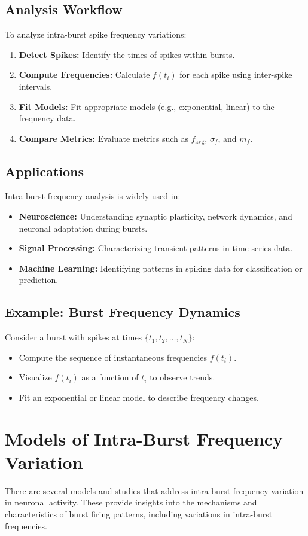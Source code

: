 \documentclass[a4paper,9pt]{extarticle}
\begin{document}
\subsection{Analysis Workflow}
To analyze intra-burst spike frequency variations:
\begin{enumerate}
    \item \textbf{Detect Spikes:} Identify the times of spikes within bursts.
    \item \textbf{Compute Frequencies:} Calculate $f(t_i)$ for each spike using inter-spike intervals.
    \item \textbf{Fit Models:} Fit appropriate models (e.g., exponential, linear) to the frequency data.
    \item \textbf{Compare Metrics:} Evaluate metrics such as $f_{\text{avg}}$, $\sigma_f$, and $m_f$.
\end{enumerate}

\subsection{Applications}
Intra-burst frequency analysis is widely used in:
\begin{itemize}
    \item \textbf{Neuroscience:} Understanding synaptic plasticity, network dynamics, and neuronal adaptation during bursts.
    \item \textbf{Signal Processing:} Characterizing transient patterns in time-series data.
    \item \textbf{Machine Learning:} Identifying patterns in spiking data for classification or prediction.
\end{itemize}

\subsection{Example: Burst Frequency Dynamics}
Consider a burst with spikes at times $\{t_1, t_2, \dots, t_N\}$:
\begin{itemize}
    \item Compute the sequence of instantaneous frequencies $f(t_i)$.
    \item Visualize $f(t_i)$ as a function of $t_i$ to observe trends.
    \item Fit an exponential or linear model to describe frequency changes.
\end{itemize}



\section{Models of Intra-Burst Frequency Variation}
There are several models and studies that address intra-burst frequency variation in neuronal activity. These provide insights into the mechanisms and characteristics of burst firing patterns, including variations in intra-burst frequencies.
\end{document}

